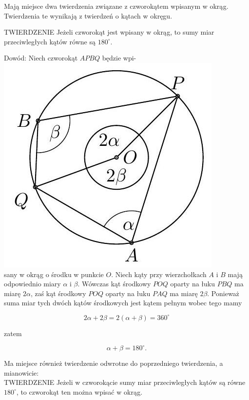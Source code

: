 \documentclass[10pt]{article}
\begin{document}
Mają miejsce dwa twierdzenia związane z czworokątem wpisanym w okrąg. Twierdzenia te wynikają z twierdzeń o kątach w okręgu.

TWIERDZENIE Jeżeli czworokąt jest wpisany w okrąg, to sumy miar przeciwległych kątów równe są \(180^{\circ}\).

Dowód: Niech czworokąt \(A P B Q\) będzie wpi-\\
\includegraphics[max width=\textwidth, center]{2024_11_21_71f62bd117d375398909g-197}\\
sany w okrąg o środku w punkcie \(O\). Niech kąty przy wierzchołkach \(A\) i \(B\) mają odpowiednio miary \(\alpha\) i \(\beta\). Wówczas kąt środkowy \(P O Q\) oparty na łuku \(P B Q\) ma miarę \(2 \alpha\), zaś kąt środkowy \(P O Q\) oparty na łuku \(P A Q\) ma miarę \(2 \beta\). Ponieważ suma miar tych dwóch kątów środkowych jest kątem pełnym wobec tego mamy

\[
2 \alpha+2 \beta=2(\alpha+\beta)=360^{\circ}
\]

zatem

\[
\alpha+\beta=180^{\circ} .
\]

Ma miejsce również twierdzenie odwrotne do poprzedniego twierdzenia, a mianowicie:\\
TWIERDZENIE Jeżeli w czworokącie sumy miar przeciwległych kątów są równe \(180^{\circ}\), to czworokąt ten można wpisać w okrąg.
\end{document}
